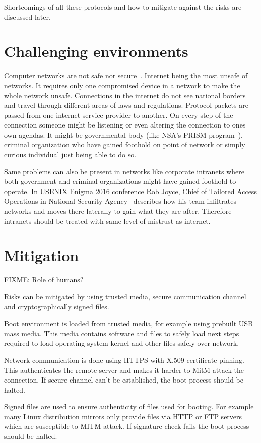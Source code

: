 Shortcomings of all these protocols and how to mitigate against the
risks are discussed later.

\section{Challenging environments}

Computer networks are not safe nor secure~\cite{beyondcorp}. Internet
being the most unsafe of networks. It requires only one compromised
device in a network to make the whole network unsafe. Connections in
the internet do not see national borders and travel through different
areas of laws and regulations. Protocol packets are passed from one
internet service provider to another. On every step of the connection
someone might be listening or even altering the connection to ones own
agendas. It might be governmental body (like NSA's PRISM
program~\cite{nsa-prism}), criminal organization who have gained
foothold on point of network or simply curious individual just being
able to do so.

Same problems can also be present in networks like corporate intranets
where both government and criminal organizations might have gained
foothold to operate. In USENIX Enigma 2016 conference Rob Joyce, Chief
of Tailored Access Operations in National Security
Agency~\cite{nsa-tao} describes how his team infiltrates networks and
moves there laterally to gain what they are after. Therefore intranets
should be treated with same level of mistrust as internet.


\section{Mitigation}

FIXME: Role of humans?

Risks can be mitigated by using trusted media, secure communication
channel and cryptographically signed files.

Boot environment is loaded from trusted media, for example using
prebuilt USB mass media. This media contains software and files to
safely load next steps required to load operating system kernel and
other files safely over network.

Network communication is done using HTTPS with X.509 certificate
pinning. This authenticates the remote server and makes it harder to
MitM attack the connection. If secure channel can't be established,
the boot process should be halted.

Signed files are used to ensure authenticity of files used for
booting. For example many Linux distribution mirrors only provide
files via HTTP or FTP servers which are susceptible to MITM attack. If
signature check fails the boot process should be halted.


